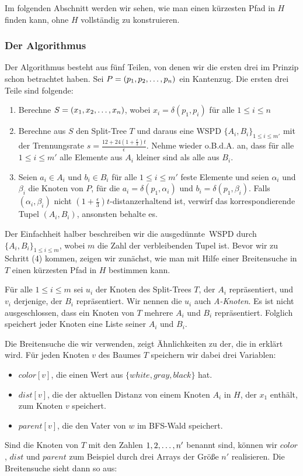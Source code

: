     Im folgenden Abschnitt werden wir sehen, wie man einen kürzesten Pfad in $H$ finden kann, ohne $H$ vollständig zu konstruieren.
    
    \subsubsection*{Der Algorithmus}
    Der Algorithmus besteht aus fünf Teilen, von denen wir die ersten drei im Prinzip schon betrachtet haben.
    Sei $P = (p_1, p_2, \mathellipsis, p_n)$ ein Kantenzug. 
    Die ersten drei Teile sind folgende:
    \begin{enumerate}
    	\item Berechne $S = (x_1, x_2, \mathellipsis, x_n)$, wobei $x_i = \delta(p_1, p_i)$ für alle $1 \leq i \leq n$
    	\item Berechne aus $S$ den Split-Tree $T$ und daraus eine WSPD $\{A_i, B_i\}_{1 \leq i \leq m'}$ mit der Trennungsrate $s = \frac{12 + 24(1 + \frac{\epsilon}{3})t}{\epsilon}$. Nehme wieder o.B.d.A. an, dass für alle $1 \leq i \leq m'$ alle Elemente aus $A_i$ kleiner sind als alle aus $B_i$.
    	\item Seien $a_i \in A_i$ und $b_i \in B_i$ für alle $1 \leq i \leq m'$ feste Elemente und seien $\alpha_i$ und  $\beta_i$ die Knoten von $P$, für die $a_i = \delta(p_1, \alpha_i)$ und $b_i = \delta(p_1, \beta_i)$. Falls $(\alpha_i, \beta_i)$ nicht $(1+\frac{\epsilon}{3})t$-distanzerhaltend ist, verwirf das korrespondierende Tupel $(A_i, B_i)$, ansonsten behalte es.
    \end{enumerate}
    
    Der Einfachheit halber beschreiben wir die \glqq ausgedünnte\grqq\ WSPD durch $\{A_i, B_i\}_{1\leq i \leq m}$, wobei $m$ die Zahl der verbleibenden Tupel ist.
    Bevor wir zu Schritt (4) kommen, zeigen wir zunächst, wie man mit Hilfe einer Breitensuche in $T$ einen kürzesten Pfad in $H$ bestimmen kann.  
    
    Für alle $1 \leq i \leq m$ sei $u_i$ der Knoten des Split-Trees $T$, der $A_i$ repräsentiert, und $v_i$ derjenige, der $B_i$ repräsentiert. Wir nennen die $u_i$ auch \emph{A-Knoten}. Es ist nicht ausgeschlossen, dass ein Knoten von $T$ mehrere $A_i$ und $B_i$ repräsentiert. Folglich speichert jeder Knoten eine Liste seiner $A_i$ und $B_i$.
    
    Die Breitensuche die wir verwenden, zeigt Ähnlichkeiten zu der, die in \cite{hagerup} erklärt wird. Für jeden Knoten $v$ des Baumes $T$ speichern wir dabei drei Variablen:
    \begin{itemize}
    	\item $color[v]$, die einen Wert aus $\{white, gray, black\}$ hat.
    	\item $dist[v]$, die der aktuellen Distanz von einem Knoten $A_i$ in $H$, der $x_1$ enthält, zum Knoten $v$ speichert.
    	\item $parent[v]$, die den Vater von $w$ im BFS-Wald speichert.
    \end{itemize}
    Sind die Knoten von $T$ mit den Zahlen $1, 2,\mathellipsis, n'$ benannt sind, können wir $color$, $dist$ und $parent$ zum Beispiel durch drei Arrays der Größe $n'$ realisieren.
    Die Breitensuche sieht dann so aus:
    
